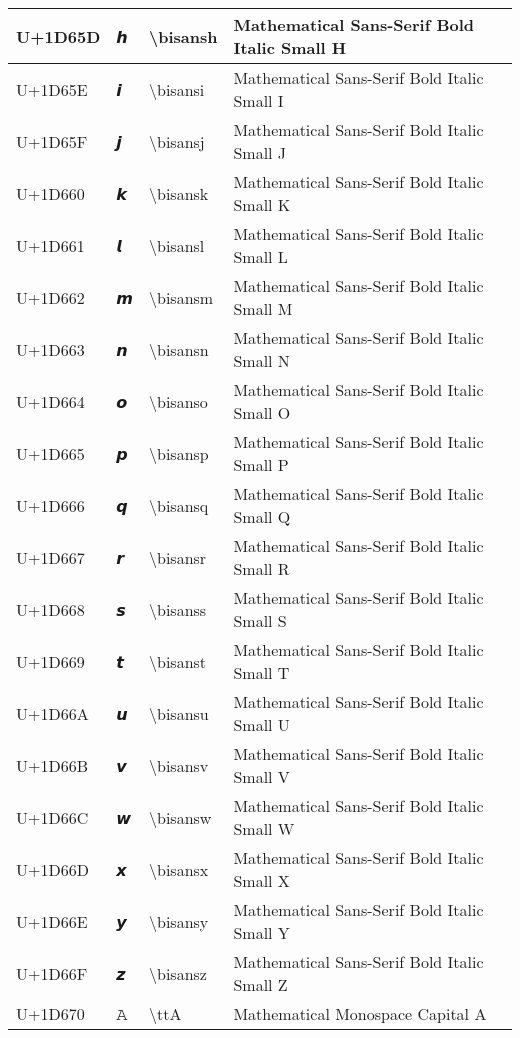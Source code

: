 \begin{table}[h]
\begin{tabulary}{\linewidth}{|L|L|L|L|}
\hline
U+1D65D & 𝙝 & {\textbackslash}bisansh & Mathematical Sans-Serif Bold Italic Small H \\
\hline
U+1D65E & 𝙞 & {\textbackslash}bisansi & Mathematical Sans-Serif Bold Italic Small I \\
\hline
U+1D65F & 𝙟 & {\textbackslash}bisansj & Mathematical Sans-Serif Bold Italic Small J \\
\hline
U+1D660 & 𝙠 & {\textbackslash}bisansk & Mathematical Sans-Serif Bold Italic Small K \\
\hline
U+1D661 & 𝙡 & {\textbackslash}bisansl & Mathematical Sans-Serif Bold Italic Small L \\
\hline
U+1D662 & 𝙢 & {\textbackslash}bisansm & Mathematical Sans-Serif Bold Italic Small M \\
\hline
U+1D663 & 𝙣 & {\textbackslash}bisansn & Mathematical Sans-Serif Bold Italic Small N \\
\hline
U+1D664 & 𝙤 & {\textbackslash}bisanso & Mathematical Sans-Serif Bold Italic Small O \\
\hline
U+1D665 & 𝙥 & {\textbackslash}bisansp & Mathematical Sans-Serif Bold Italic Small P \\
\hline
U+1D666 & 𝙦 & {\textbackslash}bisansq & Mathematical Sans-Serif Bold Italic Small Q \\
\hline
U+1D667 & 𝙧 & {\textbackslash}bisansr & Mathematical Sans-Serif Bold Italic Small R \\
\hline
U+1D668 & 𝙨 & {\textbackslash}bisanss & Mathematical Sans-Serif Bold Italic Small S \\
\hline
U+1D669 & 𝙩 & {\textbackslash}bisanst & Mathematical Sans-Serif Bold Italic Small T \\
\hline
U+1D66A & 𝙪 & {\textbackslash}bisansu & Mathematical Sans-Serif Bold Italic Small U \\
\hline
U+1D66B & 𝙫 & {\textbackslash}bisansv & Mathematical Sans-Serif Bold Italic Small V \\
\hline
U+1D66C & 𝙬 & {\textbackslash}bisansw & Mathematical Sans-Serif Bold Italic Small W \\
\hline
U+1D66D & 𝙭 & {\textbackslash}bisansx & Mathematical Sans-Serif Bold Italic Small X \\
\hline
U+1D66E & 𝙮 & {\textbackslash}bisansy & Mathematical Sans-Serif Bold Italic Small Y \\
\hline
U+1D66F & 𝙯 & {\textbackslash}bisansz & Mathematical Sans-Serif Bold Italic Small Z \\
\hline
U+1D670 & 𝙰 & {\textbackslash}ttA & Mathematical Monospace Capital A \\

\end{tabulary}
\end{table}
